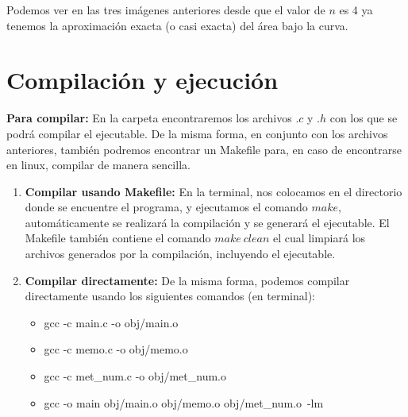 \documentclass[12pt]{article}
\begin{document}
\begin{figure}[H]
	\centering
	\hfill
\end{figure}

\begin{figure}[H]
	\centering
	\hfill
\end{figure}

Podemos ver en las tres imágenes anteriores desde que el valor de $n$ es 4 ya tenemos la aproximación exacta (o casi exacta) del área bajo la curva.

\section{Compilación y ejecución}
\textbf{Para compilar:} En la carpeta encontraremos los archivos $.c$ y $.h$ con los que se podrá compilar el ejecutable. De la misma forma, en conjunto con los archivos anteriores, también podremos encontrar un Makefile para, en caso de encontrarse en linux, compilar de manera sencilla.

\begin{enumerate}
	\item \textbf{Compilar usando Makefile:} En la terminal, nos colocamos en el directorio donde se encuentre el programa, y ejecutamos el comando $make$, automáticamente se realizará la compilación y se generará el ejecutable. El Makefile también contiene el comando $make\ clean$ el cual limpiará los archivos generados por la compilación, incluyendo el ejecutable.
	\item \textbf{Compilar directamente:} De la misma forma, podemos compilar directamente usando los siguientes comandos (en terminal):
	\begin{itemize}
		\item gcc -c main.c -o obj/main.o
		\item gcc -c memo.c -o obj/memo.o
		\item gcc -c met\_num.c -o obj/met\_num.o
		\item gcc -o main obj/main.o obj/memo.o obj/met\_num.o\ -lm
	\end{itemize}
\end{enumerate}
\end{document}
